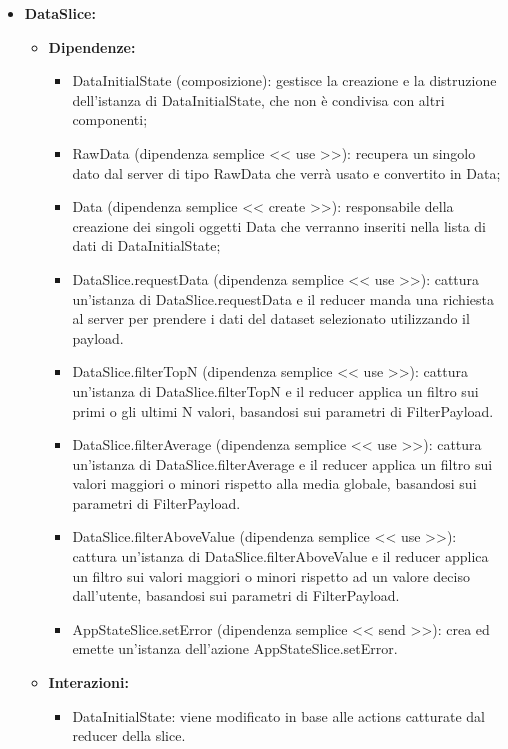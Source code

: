 \begin{itemize}
    \item \textbf{DataSlice:}
    \begin{itemize}
        \item \textbf{Dipendenze:}
        \begin{itemize}
            \item DataInitialState (composizione): gestisce la creazione e la distruzione dell'istanza di DataInitialState, che non è condivisa con altri componenti;
            \item RawData (dipendenza semplice << use >>): recupera un singolo dato dal server di tipo RawData che verrà usato e convertito in Data;
            \item Data (dipendenza semplice << create >>): responsabile della creazione dei singoli oggetti Data che verranno inseriti nella lista di dati di DataInitialState;
            \item DataSlice.requestData (dipendenza semplice << use >>): cattura un'istanza di DataSlice.requestData e il reducer manda una richiesta al server per prendere i dati del dataset selezionato utilizzando il payload.
            \item DataSlice.filterTopN (dipendenza semplice << use >>): cattura un'istanza di DataSlice.filterTopN e il reducer applica un filtro sui primi o gli ultimi N valori, basandosi sui parametri di FilterPayload.
            \item DataSlice.filterAverage (dipendenza semplice << use >>): cattura un’istanza di DataSlice.filterAverage e il reducer applica un filtro sui valori maggiori o minori rispetto alla media globale, basandosi sui parametri di FilterPayload.
            \item DataSlice.filterAboveValue (dipendenza semplice << use >>): cattura un’istanza di DataSlice.filterAboveValue e il reducer applica un filtro sui valori maggiori o minori rispetto ad un valore deciso dall'utente, basandosi sui parametri di FilterPayload.
            \item AppStateSlice.setError (dipendenza semplice << send >>): crea ed emette un’istanza dell’azione AppStateSlice.setError.
        \end{itemize} 
        \item \textbf{Interazioni:}
        \begin{itemize}
            \item DataInitialState: viene modificato in base alle actions catturate dal reducer della slice.
        \end{itemize} 

\end{itemize}
\end{itemize}
